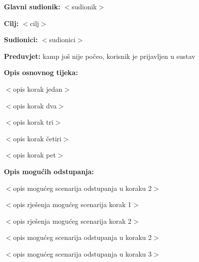 					\noindent {}
					\begin{packed_item}
						
						\item \textbf{Glavni sudionik: }$<$sudionik$>$
						\item  \textbf{Cilj:} $<$cilj$>$
						\item  \textbf{Sudionici:} $<$sudionici$>$
						\item  \textbf{Preduvjet:} kamp još nije počeo, korisnik je prijavljen u sustav
						\item  \textbf{Opis osnovnog tijeka:}
						
						\item[] \begin{packed_enum}
							
							\item $<$opis korak jedan$>$
							\item $<$opis korak dva$>$
							\item $<$opis korak tri$>$
							\item $<$opis korak četiri$>$
							\item $<$opis korak pet$>$
						\end{packed_enum}
						
						\item  \textbf{Opis mogućih odstupanja:}
						
						\item[] \begin{packed_item}
							
							\item[2.a] $<$opis mogućeg scenarija odstupanja u koraku 2$>$
							\item[] \begin{packed_enum}
								
								\item $<$opis rješenja mogućeg scenarija korak 1$>$
								\item $<$opis rješenja mogućeg scenarija korak 2$>$
								
							\end{packed_enum}
							\item[2.b] $<$opis mogućeg scenarija odstupanja u koraku 2$>$
							\item[3.a] $<$opis mogućeg scenarija odstupanja  u koraku 3$>$
							
						\end{packed_item}
					\end{packed_item}
					
